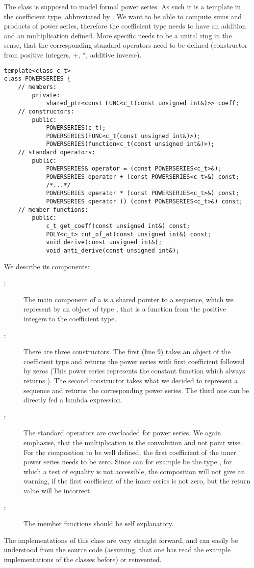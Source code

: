 The class  is supposed to model formal power series. As such it is a template in the coefficient type, abbreviated by . We want to be able to compute sums and products of power series, therefore the coefficient type needs to have an addition and an multiplication defined. More specific  needs to be a unital ring in the sense, that the corresponding standard operators need to be defined (constructor from positive integers, $+$, $*$, additive inverse). 
\begin{lstlisting}
template<class c_t>
class POWERSERIES {
	// members:
		private:
			shared_ptr<const FUNC<c_t(const unsigned int&)>> coeff;
	// constructors:
		public:
			POWERSERIES(c_t);
			POWERSERIES(FUNC<c_t(const unsigned int&)>);
			POWERSERIES(function<c_t(const unsigned int&)>);
	// standard operators:
		public:
			POWERSERIES& operator = (const POWERSERIES<c_t>&);
			POWERSERIES operator + (const POWERSERIES<c_t>&) const;
			/*...*/
			POWERSERIES operator * (const POWERSERIES<c_t>&) const;
			POWERSERIES operator () (const POWERSERIES<c_t>&) const; 
	// member functions:
		public:
			c_t get_coeff(const unsigned int&) const;
			POLY<c_t> cut_of_at(const unsigned int&) const;
			void derive(const unsigned int&);
			void anti_derive(const unsigned int&);	
\end{lstlisting}
We describe its components:
\begin{description}
\item[:] The main component of a  is a shared pointer to a sequence, which we represent by an object of type , that is a function from the positive integers to the coefficient type.
\item[:] There are three constructors. The first (line 9) takes an object  of the coefficient type and returns the power series with first coefficient  followed by zeros (This power series represents the constant function which always returns ). The second constructor takes what we decided to represent a sequence and returns the corresponding power series. The third one can be directly fed a \cc lambda expression.
\item[:] The standard operators are overloaded for power series. We again emphasise, that the multiplication is the convolution and not point wise. For the composition to be well defined, the first coefficient of the inner power series needs to be zero. Since  can for example be the type , for which a test of equality is not accessible, the composition will not give an warning, if the first coefficient of the inner series is not zero, but the return value will be incorrect.
\item[:] The member functions should be self explanatory.
\end{description}

The implementations of this class are very straight forward, and can easily be understood from the source code (assuming, that one has read the example implementations of the classes before) or reinvented.

